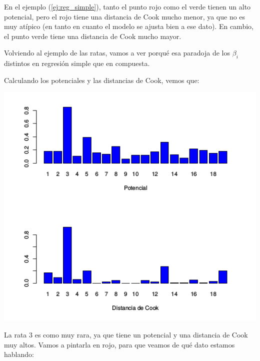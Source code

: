 En el ejemplo (\ref{ej:reg_simple}), tanto el punto rojo como el verde tienen un alto potencial, pero el rojo tiene una distancia de Cook mucho menor, ya que no es muy atípico  (en tanto en cuanto el modelo se ajusta bien a ese dato). En cambio, el punto verde tiene una distancia de Cook mucho mayor.

Volviendo al ejemplo de las ratas, vamos a ver porqué esa paradoja de los $β_i$ distintos en regresión simple que en compuesta.



Calculando los potenciales y las distancias de Cook, vemos que:
\begin{center}
\includegraphics[scale=0.75]{img/CookVsPotencial.png}
\end{center}

La rata 3 es como muy rara, ya que tiene un potencial y una distancia de Cook muy altos. Vamos a pintarla en rojo, para que veamos de qué dato estamos hablando:

